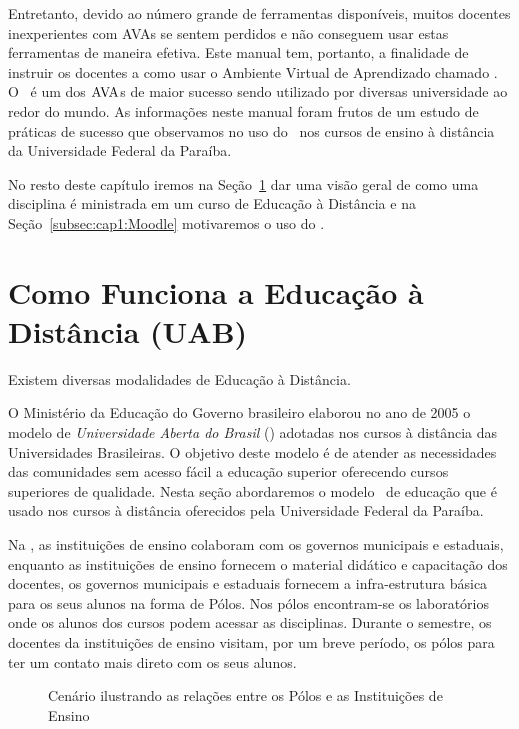 Entretanto, devido ao número grande de ferramentas disponíveis, muitos docentes inexperientes
com AVAs se sentem perdidos e não conseguem usar estas ferramentas de maneira efetiva. 
Este manual tem, portanto, a finalidade de instruir os docentes a como usar o Ambiente Virtual de Aprendizado 
chamado \emph{\moodle}. O \moodle\ é um dos $\hbox{AVA}$s de maior sucesso sendo utilizado por diversas 
universidade ao redor do mundo. As informações neste manual foram frutos de um 
estudo de práticas de sucesso que observamos no uso do \moodle\ 
nos cursos de ensino à distância da Universidade Federal da Paraíba. 

No resto deste capítulo iremos na Seção~\ref{subsec:cap1:Ead} dar uma visão geral de como uma disciplina
é ministrada em um curso de Educação à Distância e na Seção~\ref{subsec:cap1:Moodle} motivaremos o
uso do \moodle.

\section{Como Funciona a Educação à Distância (UAB)}
\label{subsec:cap1:Ead}

Existem diversas modalidades de Educação à Distância.  

O Ministério da Educação do Governo brasileiro elaborou no ano de 2005 o modelo de 
\emph{Universidade Aberta do Brasil} (\uab) adotadas nos cursos à distância das 
Universidades Brasileiras. O objetivo deste modelo é de atender as necessidades 
das comunidades sem acesso fácil a educação superior oferecendo cursos superiores de qualidade.
Nesta seção abordaremos o modelo \uab\ de educação que é usado nos cursos à distância oferecidos pela
Universidade Federal da Paraíba.

Na \uab, as instituições de ensino colaboram com os governos municipais e 
estaduais, enquanto as instituições de ensino fornecem o material didático e capacitação 
dos docentes, os governos municipais e estaduais fornecem a infra-estrutura básica 
para os seus alunos na forma de Pólos. Nos pólos encontram-se os laboratórios onde
os alunos dos cursos podem acessar as disciplinas. Durante o semestre, os docentes
da instituições de ensino visitam, por um breve período, os pólos para ter um contato mais direto com os 
seus alunos. 
\begin{figure}[htbp]
 \begin{center}
  \caption{Cenário ilustrando as relações entre os Pólos e as Instituições de Ensino}
  \label{fig:UAB}
 \end{center}
\end{figure}

